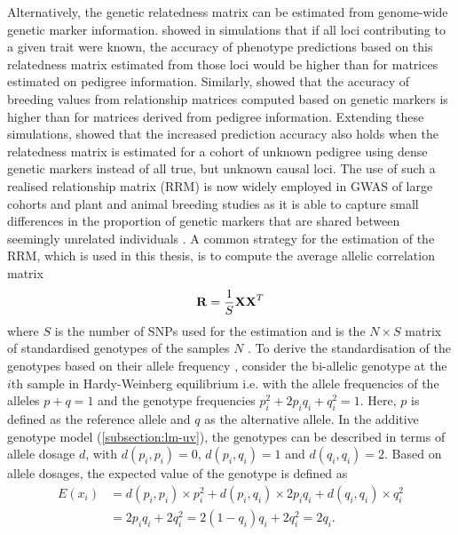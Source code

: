 Alternatively, the genetic relatedness matrix can be estimated from genome-wide genetic marker information. \citet{Nejati-Javaremi1997} showed in simulations that if all loci contributing to a given trait were known, the accuracy of phenotype predictions based on this relatedness matrix estimated from those loci would be higher than for matrices estimated on pedigree information. Similarly, \citet{Villanueva2005} showed that the accuracy of breeding values from relationship matrices computed based on genetic markers is higher than for matrices derived from pedigree information. Extending these simulations, \citet{Hayes2009} showed that the increased prediction accuracy also holds when the relatedness matrix is estimated for a cohort of unknown pedigree using dense genetic markers instead of all true, but unknown causal loci. The use of such a realised relationship matrix (RRM) is now widely employed in GWAS of large cohorts and plant and animal breeding studies as it is able to capture small differences in the proportion of genetic markers that are shared between seemingly unrelated individuals \citep{Lee2010,Lopes2013}. A common strategy for the estimation of the RRM, which is used in this thesis, is to compute the average allelic correlation matrix
%
 \begin{equation}
 \boldsymbol{\mathbf{R}} = \frac{1}{S}\boldsymbol{\mathbf{XX}}^T
 \label{eq:relatedness}
 \end{equation}
where \(S\) is the number of SNPs used for the estimation and  is the \(N \times S\) matrix of standardised genotypes of the samples \(N\) \citep{Patterson2006,Yang2011}. To derive the standardisation of the genotypes based on their allele frequency \citep{Patterson2006,Yang2011,Casale2015}, consider the bi-allelic genotype at the \(i\)th sample  in Hardy-Weinberg equilibrium i.e. with the allele frequencies of the alleles  \(p + q =1\) and the genotype frequencies \(p_i^2 + 2p_iq_i + q_i^2 = 1\). Here,  \(p\) is defined as the reference allele and  \(q\) as the alternative allele. In the additive genotype model (\cref{subsection:lm-uv}), the genotypes can be described in terms of allele dosage \(d\), with \(d(p_i,p_i) = 0\), \(d(p_i,q_i) = 1\) and \(d(q_i,q_i) = 2\). Based on allele dosages, the expected value of the genotype is defined as 
\begin{align}
E(x_i) &=  d(p_i,p_i) \times p_i^2 + d(p_i,q_i) \times 2p_iq_i + d(q_i,q_i) \times  q_i^2 \\
		  &= 2p_iq_i + 2q_i^2 = 2(1-q_i)q_i + 2q_i^2 = 2q_i.
\end{align}

